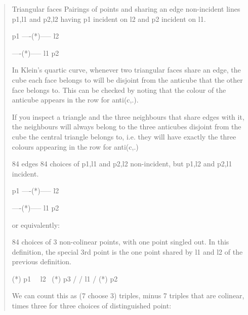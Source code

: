 \begin{quote}
Triangular faces           Pairings of points and
sharing an edge            non-incident lines {p1,l1} and
                           {p2,l2} having p1 incident on l2 and
                           p2 incident on l1.

                               p1
                           ----(*)----- l2

                           ----(*)----- l1
                               p2

In Klein's quartic curve, whenever two triangular faces share an edge, 
the cube each face belongs to will be disjoint from the anticube that 
the other face belongs to.  This can be checked by noting that the colour 
of the anticube appears in the row for anti(c,.).

If you inspect a triangle and the three neighbours that share edges with 
it, the neighbours will always belong to the three anticubes disjoint 
from the cube the central triangle belongs to, i.e. they will have 
exactly the three colours appearing in the row for anti(c,.)

84 edges                   84 choices of {p1,l1} and {p2,l2}
                           non-incident, but {p1,l2} and {p2,l1}
                           incident.

                               p1
                           ----(*)----- l2

                           ----(*)----- l1
                               p2

                           or equivalently:

                           84 choices of 3 non-colinear points,
                           with one point singled out.  In this
                           definition, the special 3rd point is
                           the one point shared by l1 and l2
                           of the previous definition.

                           (*) p1
                              \
                               \ l2
                                \
                                 (*) p3
                                /
                               / l1
                              /
                           (*) p2

                           We can count this as (7 choose 3) triples,
                           minus 7 triples that are colinear, times
                           three for three choices of distinguished
                           point:


\end{quote}
